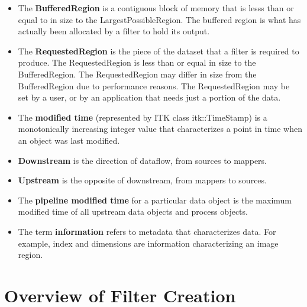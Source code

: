 \begin{itemize}
        \item The \textbf{BufferedRegion} is a contiguous block of memory
        that is lesss than or equal to in size to the
        LargestPossibleRegion. The buffered region is what has actually been
        allocated by a filter to hold its output.

        \item The \textbf{RequestedRegion} is the piece of the dataset that a
        filter is required to produce. The RequestedRegion is less than or
        equal in size to the BufferedRegion. The RequestedRegion may differ
        in size from the BufferedRegion due to performance reasons. The
        RequestedRegion may be set by a user, or by an application that needs
        just a portion of the data.

        \item The \textbf{modified time} (represented by ITK class
        itk::TimeStamp) is a monotonically increasing integer value that
        characterizes a point in time when an object was last modified.

        \item \textbf{Downstream} is the direction of dataflow, from sources
        to mappers.

        \item \textbf{Upstream} is the opposite of downstream, from mappers
        to sources.

        \item The \textbf{pipeline modified time} for a particular data
        object is the maximum modified time of all upstream data objects and
        process objects.

        \item The term \textbf{information} refers to metadata that
        characterizes data. For example, index and dimensions are information
        characterizing an image region.
\end{itemize}

\section{Overview of Filter Creation}
\label{sec:OverviewFilterCreation}

